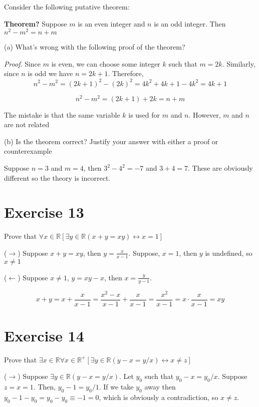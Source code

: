\documentclass[11pt]{article}
\newcommand{\bicond}{\leftrightarrow}
\begin{document}
Consider the following putative theorem:

\textbf{Theorem?} Suppose $m$ is an even integer and $n$ is an odd integer. 
Then $n^2 - m^2 = n + m$

\noindent (a) What's wrong with the following proof of the theorem?

\textit{Proof}. Since $m$ is even, we can choose some integer $k$ such that 
$m = 2k$. Similarly, since $n$ is odd we have $n = 2k + 1$. Therefore, 
$$n^2 - m^2 = (2k + 1)^2 - (2k)^2 = 4k^2 + 4k + 1 - 4k^2 = 4k + 1$$

$$n^2 - m^2 = (2k + 1) + 2k = n + m$$

The mistake is that the same variable $k$ is used for $m$ and $n$. However, 
$m$ and $n$ are not related

\noindent (b) Is the theorem correct? Justify your answer with either a proof or 
counterexample

Suppose $n = 3$ and $m = 4$, then $3^2 - 4^2 = -7$ and $3 + 4 = 7$. These are 
obviously different so the theory is incorrect.

\section*{Exercise 13}

Prove that 
$\forall x \in \mathbb{R} [\exists y \in \mathbb{R} (x + y = xy) \bicond x = 1]$

($\rightarrow$) Suppose $x + y = xy$, then $y = \frac{x}{x - 1}$. Suppose, 
$x = 1$, then $y$ is undefined, so $x \neq 1$

($\leftarrow$) Suppose $x \neq 1$, $y = xy - x$, then $x = \frac{y}{y - 1}$.

$$
x + y = 
x + \frac{x}{x - 1} = 
\frac{x^2 - x}{x - 1} + \frac{x}{x - 1} = 
\frac{x^2}{x-1} = 
x \cdot \frac{x}{x-1} = 
xy
$$

\section*{Exercise 14}

Prove that 
$\exists x \in \mathbb{R} \forall x \in \mathbb{R}^+ [\exists y \in \mathbb{R} (y - x = y / x) \bicond x \neq z]$

($\rightarrow$) Suppose $\exists y \in \mathbb{R} (y - x = y/x)$.
Let $y_0$ such that $y_0 - x = y_0 / x$. Suppose $z = x = 1$. Then, 
$y_0 - 1 = y_0 / 1$. If we take $y_0$ away then 
$y_0 - 1 - y_0 = y_0 - y_0 \equiv -1 = 0$, which is obviously a contradiction,
so $x \neq z$.
\end{document}
